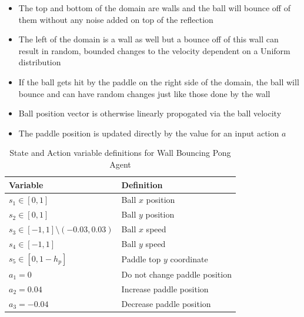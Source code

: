 \documentclass{article}[12pt]
\begin{document}
   \begin{itemize} 
   	\item The top and bottom of the domain are walls and the ball will bounce off of them without any noise added on top of the reflection
   	\item The left of the domain is a wall as well but a bounce off of this wall can result in random, bounded changes to the velocity dependent on a Uniform distribution
   	\item If the ball gets hit by the paddle on the right side of the domain, the ball will bounce and can have random changes just like those done by the wall
   	\item Ball position vector is otherwise linearly propogated via the ball velocity
   	\item The paddle position is updated directly by the value for an input action $a$
   \end{itemize}
   
    \begin{table}[ht]
   	\centering
   	\begin{tabular}{l | l}
   		\hline
   		Variable & Definition  \\
   		\hline \hline 
   		$s_1 \in [0,1]$ & Ball $x$ position\\
   		$s_2 \in [0,1]$ & Ball $y$ position\\
   		$s_3 \in [-1,1]\setminus (-0.03,0.03)$ & Ball $x$ speed \\
   		$s_4 \in [-1,1]$ & Ball $y$ speed \\
   		$s_5 \in [0, 1-h_p]$ & Paddle top $y$ coordinate\\
   		$a_1 = 0$ & Do not change paddle position\\
   		$a_2 = 0.04$ & Increase paddle position\\
   		$a_3 = -0.04 $ & Decrease paddle position \\
   		\hline
   	\end{tabular}
   	\caption{State and Action variable definitions for Wall Bouncing Pong Agent} \label{tab:vwall}
   \end{table}
\end{document}
